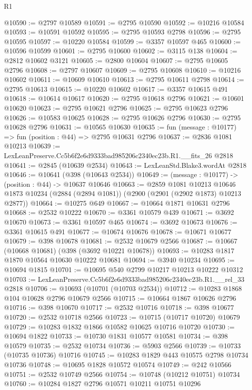 \begin{lexlean}{R1}
\begin{coremodule}
@10590 := @2797 @10589
@10591 := @2795 @10590
@10592 := @10216 @10584
@10593 := @10591 @10592
@10595 := @2795 @10593 @2798
@10596 := @2795 @10595
@10597 := @10220 @10584
@10599 := @3357 @10597 @465
@10600 := @10596 @10599
@10601 := @2795 @10600
@10602 := @3115 @138
@10604 := @2812 @10602 @3121
@10605 := @2800 @10604
@10607 := @2795 @10605 @2796
@10608 := @2797 @10607
@10609 := @2795 @10608
@10610 := @10216 @10602
@10611 := @10609 @10610
@10613 := @2795 @10611 @2798
@10614 := @2795 @10613
@10615 := @10220 @10602
@10617 := @3357 @10615 @491
@10618 := @10614 @10617
@10620 := @2795 @10618 @2796
@10621 := @10601 @10620
@10623 := @2795 @10621 @2796
@10625 := @2795 @10623 @2796
@10626 := @10583 @10625
@10628 := @2795 @10626 @2796
@10630 := @2795 @10628 @2796
@10631 := @10565 @10630
@10635 := fun (message : @10177) => fun (position : @44) => @2795 @10631 @2796
@10637 := @2836 @1081 @10213
@10639 := LexLeanPreserve.Cc5b6f2e6d9333bad985206c2340ec23b.R1.__fits_26 @2818
@10641 := @2845 (@10639 @2534)
@10643 := LexLeanStd.Blake3.wordAt @2818
@10646 := @10641 (@398 (@10643 @2534))
@10649 := (message : @10177) -> (position : @44) -> @10637 @10646
@10663 := @2859
    @1081
    @10213
    @10646
    @1873
    @10234
    (@2884 (@2894 @1081))
    (@2900 (@2901 (@2902 @1873) @10213 @2877))
@10664 := @10275 @649
@10667 := @10664 @1871 @10631 @2796
@10668 := @2532 @10222
@10670 := @3361 @10579 @439
@10671 := @3692 @10670
@10673 := @3361 @10597 @465
@10674 := @3692 @10673
@10676 := @3361 @10615 @491
@10677 := @10674 @10676
@10678 := @10671 @10677
@10679 := @398 @10678
@10681 := @2532 @10679 @2566
@10687 := @10667 (@10668 @10681) (@398 (@3692 @10221 @10678))
@10693 := @10283 @1817 @1870 @10564 @10630 @10222 @10681
@10694 := @3940 @10234
@10695 := @10694 @1815
@10701 := @10695 @540 @2799 @10217 @10213 @10222 @10312
@10703 := LexLeanPreserve.Cc5b6f2e6d9333bad985206c2340ec23b.R1.__rel_33 @2818
@10706 := @10693 (@10701 (@10703 @2534))
@10712 := @10283 @1868 @104 @10628 @2796 @10679 @2566
@10715 := @10664 @1867 @10626 @2796
@10716 := @398 @10670
@10717 := @2532 @10716
@10718 := @398 @10677
@10720 := @2532 @10718 @2566
@10723 := @10715 (@10717 @10720) @10679
@10729 := @10283 @1832 @1866 @10582 @10625 @10716 @10720
@10730 := @10694 @1822
@10733 := @10730 @1831 @10577 @10581
@10734 := @398 @10579
@10735 := @2532 @10734
@10736 := @5903 @2566
@10739 := @10733 (@10735 @10736) @10716
@10745 := @10283 @1829 @443 @10575 @2798 @10734 @10736
@10748 := @10695 @1828 @10572 @10574
@10749 := @242 @10566
@10751 := @2532 @10749 @2566
@10754 := @10748 (@10212 @10751) @10734
@10760 := @10284 @1827 @2796 @10571 @10211 @10751 @10296

\end{coremodule}
\end{lexlean}

